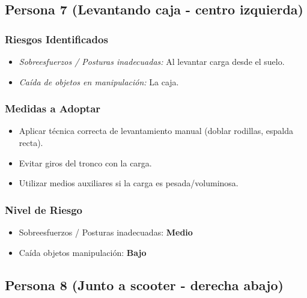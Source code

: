 \documentclass[12pt,a4paper]{article}
\begin{document}
	\subsection{Persona 7 (Levantando caja - centro izquierda)}
	
	\subsubsection{Riesgos Identificados}
	\begin{itemize}
		\item \textit{Sobreesfuerzos / Posturas inadecuadas:} Al levantar carga desde el suelo.
		\item \textit{Caída de objetos en manipulación:} La caja.
	\end{itemize}
	
	\subsubsection{Medidas a Adoptar}
	\begin{itemize}
		\item Aplicar técnica correcta de levantamiento manual (doblar rodillas, espalda recta).
		\item Evitar giros del tronco con la carga.
		\item Utilizar medios auxiliares si la carga es pesada/voluminosa.
	\end{itemize}
	
	\subsubsection{Nivel de Riesgo}
	\begin{itemize}
		\item Sobreesfuerzos / Posturas inadecuadas: \textbf{Medio}
		\item Caída objetos manipulación: \textbf{Bajo}
	\end{itemize}
	
	\bigskip\hrulefill\bigskip
	
	\subsection{Persona 8 (Junto a scooter - derecha abajo)}
	
\end{document}
